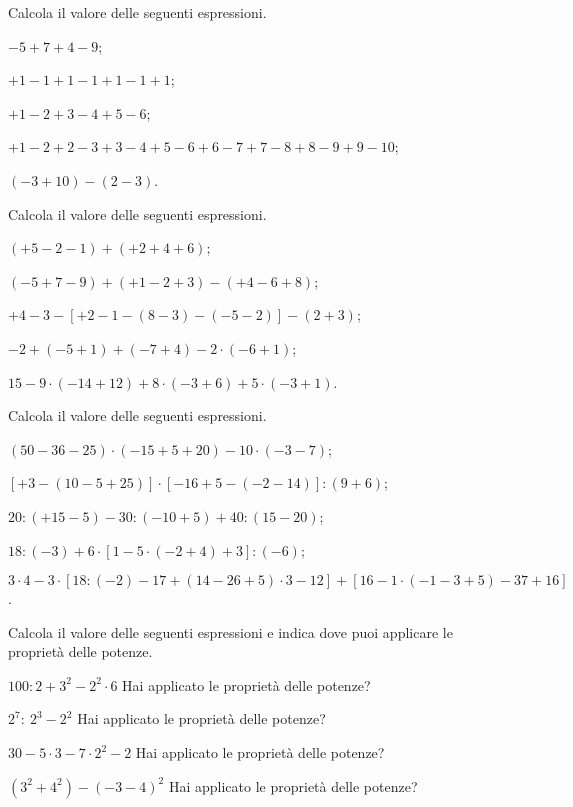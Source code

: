 \begin{esercizio}[\Ast]
Calcola il valore delle seguenti espressioni.
 \begin{enumeratea}
 \item $-5+7+4-9$;
 \item $+1-1+1-1+1-1+1$;
 \item $+1-2+3-4+5-6$;
 \item $+1-2+2-3+3-4+5-6+6-7+7-8+8-9+9-10$;
 \item $(-3+10)-(2-3)$.
 \end{enumeratea}
\end{esercizio}

\begin{esercizio}[\Ast]
Calcola il valore delle seguenti espressioni.
 \begin{enumeratea}
 \item $(+5-2-1)+(+2+4+6)$;
 \item $(-5+7-9)+(+1-2+3)-(+4-6+8)$;
 \item $+4-3-[+2-1-(8-3)-(-5-2)]-(2+3)$;
 \item $-2+(-5+1)+(-7+4)-2 \cdot (-6+1)$;
 \item $15-9 \cdot (-14+12)+8 \cdot (-3+6)+ 5 \cdot(-3+1)$.
 \end{enumeratea}
\end{esercizio}

\begin{esercizio}[\Ast]
Calcola il valore delle seguenti espressioni.
 \begin{enumeratea}
 \item $(50-36-25)\cdot (-15+5+20)-10\cdot (-3-7)$;
 \item $[+3-(10-5+25)]\cdot [-16+5-(-2-14)]:(9+6)$;
 \item $20:(+15-5)-30:(-10+5)+40:(15-20)$;
 \item $18:(-3)+6\cdot [1-5\cdot (-2+4)+3]: (-6)$;
 \item $3\cdot 4-3\cdot \left[18:\left(-2\right)-17+\left(14-26+5\right)\cdot 3-12\right]+\left[16-1\cdot \left(-1-3+5\right)-37+16\right]$.
\end{enumeratea}
\end{esercizio}

\begin{esercizio}[\Ast]
Calcola il valore delle seguenti espressioni e indica dove puoi applicare le proprietà delle potenze.
\TabPositions{3.5cm}
\begin{enumeratea}
 \item $100:2+3^2 -2^2\cdot 6$ \tab Hai applicato le proprietà delle potenze?\:\dotfill
 \item $2^7:~2^3 -2^2$ \tab Hai applicato le proprietà delle potenze?\:\dotfill
 \item $30-5\cdot 3 -7\cdot 2^2 -2$ \tab Hai applicato le proprietà delle potenze?\:\dotfill
 \item $\left(3^2 +4^2\right) -(-3-4)^2$ \tab Hai applicato le proprietà delle potenze?\:\dotfill
\end{enumeratea}
\end{esercizio}

